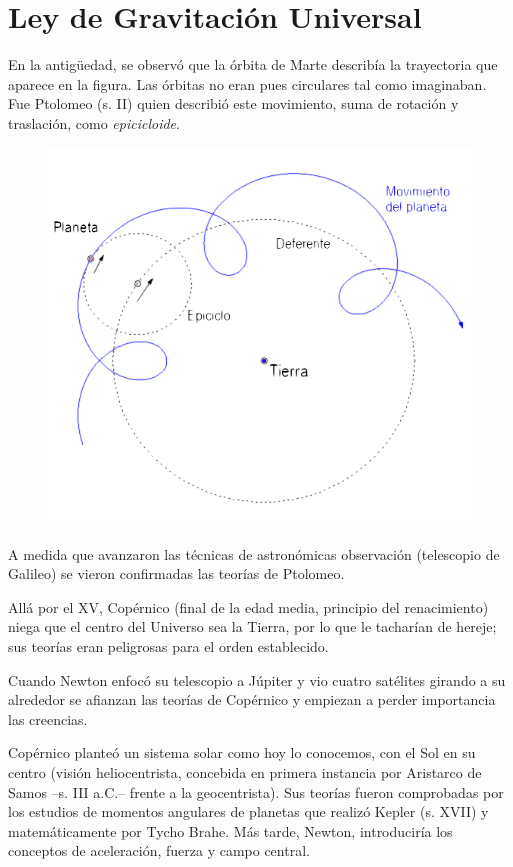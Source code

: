 \chapter{Ley de Gravitación Universal}

\begin{miparrafo}
\begin{multicols}{2}
En la antigüedad, se observó que la órbita de Marte describía la trayectoria que aparece en la figura. Las órbitas no eran pues circulares tal como imaginaban. Fue Ptolomeo (s. II) quien describió este movimiento, suma de rotación y traslación, como \emph{epicicloide}.
\begin{figure}[H]
	\centering
	\includegraphics[width=.5\textwidth]{imagenes/imagenes14/T14IM01.png}
\end{figure}
\end{multicols}
\vspace{-10mm} %
A medida que avanzaron las técnicas de astronómicas observación (telescopio de Galileo) se vieron confirmadas las teorías de Ptolomeo.

Allá por el XV, Copérnico (final de la edad media, principio del renacimiento) niega que el centro del Universo sea la Tierra, por lo que le tacharían de hereje; sus teorías eran peligrosas para el orden establecido.

Cuando Newton enfocó su telescopio a Júpiter y vio cuatro satélites girando a su alrededor se afianzan las teorías de Copérnico y empiezan a perder importancia las creencias.

Copérnico planteó un sistema solar como hoy lo conocemos, con el Sol en su centro (visión heliocentrista, concebida en primera instancia por Aristarco de Samos --s. III a.C.-- frente a la geocentrista). Sus teorías fueron comprobadas por los estudios de momentos angulares de planetas que realizó Kepler (s. XVII) y matemáticamente por Tycho Brahe. Más tarde, Newton, introduciría los conceptos de aceleración, fuerza y campo central.


\end{miparrafo}
